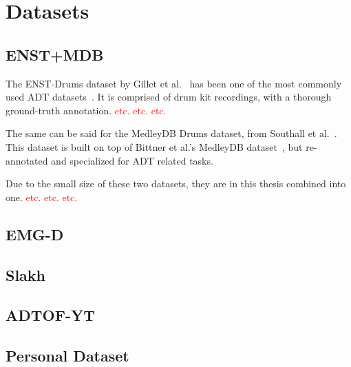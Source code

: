 \chapter{Datasets}

\section{ENST+MDB}

The ENST-Drums dataset by Gillet et al.~\cite{gillet_2006_7432188} has been one of the most commonly used \gls{ADT} datasets~\cite{8350302}. It is comprised of drum kit recordings, with a thorough ground-truth annotation.  \textcolor{red}{etc. etc. etc.}

The same can be said for the MedleyDB Drums dataset, from Southall et al.~\cite{southall2017mdb}. This dataset is built on top of Bittner et al.'s MedleyDB dataset~\cite{rachel_bittner_2014_1438309}, but re-annotated and specialized for \gls{ADT} related tasks.

Due to the small size of these two datasets, they are in this thesis combined into one. \textcolor{red}{etc. etc. etc.}

\section{EMG-D}

\section{Slakh}

\section{ADTOF-YT}

\section{Personal Dataset}